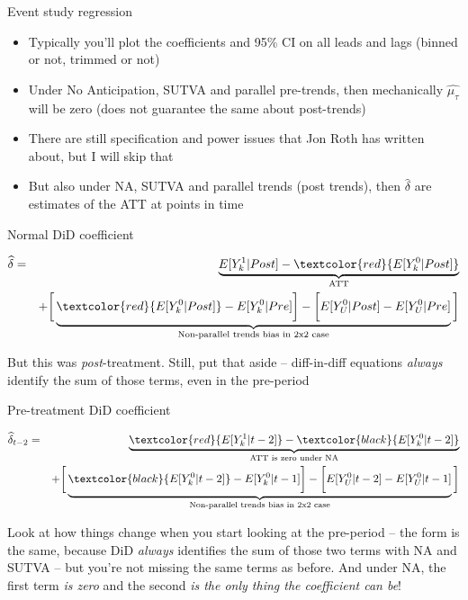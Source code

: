 \documentclass{beamer}
\begin{document}
\begin{frame}{Event study regression}


\begin{itemize}
\item  Typically you'll plot the coefficients and 95\% CI on all leads and lags (binned or not, trimmed or not) 
\item Under No Anticipation, SUTVA and parallel pre-trends, then mechanically $\widehat{\mu_{\tau}}$ will be zero (does not guarantee the same about post-trends)
\item There are still specification and power issues that Jon Roth has written about, but I will skip that
\item But also under NA, SUTVA and parallel trends (post trends), then $\widehat{\delta}$ are estimates of the ATT at points in time
\end{itemize}

\end{frame}

\begin{frame}{Normal DiD coefficient}

\begin{eqnarray*}
\widehat{\delta} &=& \underbrace{E[Y^1_k | Post] - \textcolor{red}{E[Y^0_k | Post]}}_{\mathclap{\text{ATT}}} \\
&& + \bigg [  \underbrace{\textcolor{red}{E[Y^0_k | Post]} - E[Y^0_k | Pre] \bigg ] - \bigg [ E[Y^0_U | Post] - E[Y_U^0 | Pre] }_{\mathclap{\text{Non-parallel trends bias in 2x2 case}}} \bigg ]
\end{eqnarray*}

\bigskip

But this was \emph{post}-treatment.  Still, put that aside -- diff-in-diff equations \emph{always} identify the sum of those terms, even in the pre-period


\end{frame}

\begin{frame}{Pre-treatment DiD coefficient}

\begin{eqnarray*}
\widehat{\delta}_{t-2} &=& \underbrace{\textcolor{red}{E[Y^1_k | t-2]} - \textcolor{black}{E[Y^0_k | t-2]}}_{\mathclap{\text{ATT is zero under NA}}} \\
&& + \bigg [  \underbrace{\textcolor{black}{E[Y^0_k | t-2]} - E[Y^0_k | t-1] \bigg ] - \bigg [ E[Y^0_U | t-2] - E[Y_U^0 | t-1] }_{\mathclap{\text{Non-parallel trends bias in 2x2 case}}} \bigg ]
\end{eqnarray*}

\bigskip

Look at how things change when you start looking at the pre-period -- the form is the same, because DiD \emph{always} identifies the sum of those two terms with NA and SUTVA -- but you're not missing the same terms as before.  And under NA, the first term \emph{is zero} and the second \emph{is the only thing the coefficient can be}!


\end{frame}
\end{document}
